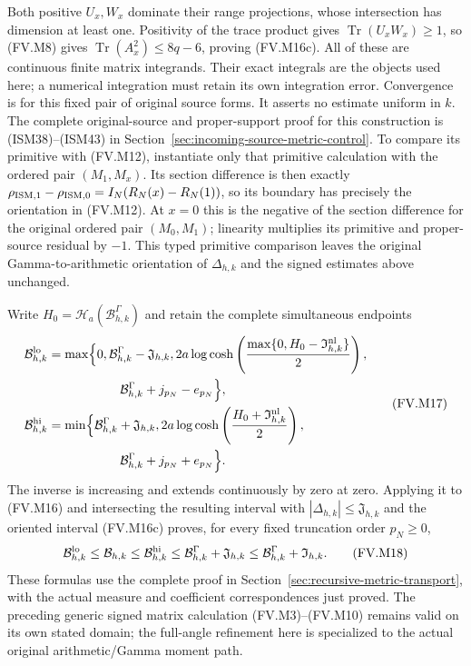 Both positive $U_x,W_x$ dominate their range projections, whose
intersection has dimension at least one. Positivity of the trace
product gives $\operatorname{Tr}(U_xW_x)\ge1$, so (FV.M8) gives
$\operatorname{Tr}(A_x^2)\le8q-6$, proving (FV.M16c).
All of these are continuous finite matrix integrands. Their exact
integrals are the objects used here; a numerical integration must
retain its own integration error. Convergence is for this fixed pair
of original source forms. It asserts no estimate uniform in $k$.
The complete original-source and proper-support proof for this
construction is (ISM38)--(ISM43) in
Section~\ref{sec:incoming-source-metric-control}. To compare its primitive
with (FV.M12), instantiate only that primitive calculation with the ordered
pair $(M_1,M_x)$. Its section difference is then exactly
$\rho_{{\rm ISM},1}-\rho_{{\rm ISM},0}
 =I_N(R_N(x)-R_N(1))$, so its boundary has precisely the orientation
in (FV.M12). At $x=0$ this is the negative of the section difference
for the original ordered pair $(M_0,M_1)$; linearity multiplies its
primitive and proper-source residual by $-1$. This typed primitive
comparison leaves the original Gamma-to-arithmetic orientation of
$\Delta_{h,k}$ and the signed estimates above unchanged.

Write $H_0=\mathscr H_a(\mathcal B^\Gamma_{h,k})$ and retain the
complete simultaneous endpoints
\[
 \begin{aligned}
 \mathcal B_{h,k}^{\rm lo}
 &=\max\Bigl\{0,\mathcal B^\Gamma_{h,k}-\mathfrak J_{h,k},
 2a\log\cosh\left(\frac{\max\{0,H_0-\mathfrak I_{h,k}^{\rm nl}\}}2\right),\\
 &\hspace{20mm}\mathcal B^\Gamma_{h,k}+j_{p_N}-e_{p_N}\Bigr\},\\
 \mathcal B_{h,k}^{\rm hi}
 &=\min\Bigl\{\mathcal B^\Gamma_{h,k}+\mathfrak J_{h,k},
 2a\log\cosh\left(\frac{H_0+\mathfrak I_{h,k}^{\rm nl}}2\right),\\
 &\hspace{20mm}\mathcal B^\Gamma_{h,k}+j_{p_N}+e_{p_N}\Bigr\}.
 \end{aligned}\tag{FV.M17}\label{fvmetric:recursive-endpoints}
\]
The inverse is increasing and extends continuously by zero at zero.
Applying it to (FV.M16) and intersecting the resulting interval with
$|\Delta_{h,k}|\le\mathfrak J_{h,k}$ and the oriented interval
(FV.M16c) proves, for every fixed truncation order $p_N\ge0$,
\[
 \mathcal B_{h,k}^{\rm lo}\le\mathcal B_{h,k}
 \le\mathcal B_{h,k}^{\rm hi}
 \le\mathcal B^\Gamma_{h,k}+\mathfrak J_{h,k}
 \le\mathcal B^\Gamma_{h,k}+\mathfrak I_{h,k}.
 \tag{FV.M18}\label{fvmetric:recursive-budget}
\]
These formulas use the complete proof in
Section~\ref{sec:recursive-metric-transport}, with the actual measure
and coefficient correspondences just proved. The preceding generic
signed matrix calculation (FV.M3)--(FV.M10) remains valid on its own
stated domain; the full-angle refinement here is specialized to the
actual original arithmetic/Gamma moment path.
